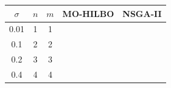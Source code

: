 \begin{table}[h]
\centering
\begin{tabular}{|c|c|c|c|c|}
\hline
$\sigma$ & $n$ & $m$ & MO-HILBO & NSGA-II \\
\hline
0.01 & 1 & 1 & \hspace{2cm} & \hspace{2cm} \\
\hline
0.1 & 2 & 2 & \hspace{2cm} & \hspace{2cm} \\
\hline
0.2 & 3 & 3 & \hspace{2cm} & \hspace{2cm} \\
\hline
0.4 & 4 & 4 & \hspace{2cm} & \hspace{2cm} \\
\hline
\end{tabular}
\label{tab:results}
\end{table}